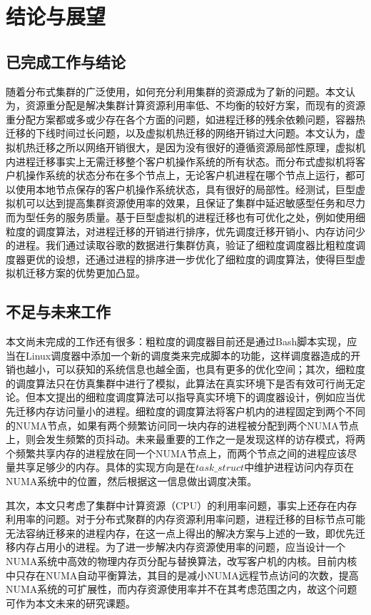 
\chapter{结论与展望}

\section{已完成工作与结论}
随着分布式集群的广泛使用，如何充分利用集群的资源成为了新的问题。本文认为，资源重分配是解决集群计算资源利用率低、不均衡的较好方案，而现有的资源重分配方案都或多或少存在各个方面的问题，如进程迁移的残余依赖问题，容器热迁移的下线时间过长问题，以及虚拟机热迁移的网络开销过大问题。本文认为，虚拟机热迁移之所以网络开销很大，是因为没有很好的遵循资源局部性原理，虚拟机内进程迁移事实上无需迁移整个客户机操作系统的所有状态。而分布式虚拟机将客户机操作系统的状态分布在多个节点上，无论客户机进程在哪个节点上运行，都可以使用本地节点保存的客户机操作系统状态，具有很好的局部性。经测试，巨型虚拟机可以达到提高集群资源使用率的效果，且保证了集群中延迟敏感型任务和尽力而为型任务的服务质量。基于巨型虚拟机的进程迁移也有可优化之处，例如使用细粒度的调度算法，对进程迁移的开销进行排序，优先调度迁移开销小、内存访问少的进程。我们通过读取谷歌的数据进行集群仿真，验证了细粒度调度器比粗粒度调度器更优的设想，还通过进程的排序进一步优化了细粒度的调度算法，使得巨型虚拟机迁移方案的优势更加凸显。

\section{不足与未来工作}
本文尚未完成的工作还有很多：粗粒度的调度器目前还是通过Bash脚本实现，应当在Linux调度器中添加一个新的调度类来完成脚本的功能，这样调度器造成的开销也越小，可以获知的系统信息也越全面，也具有更多的优化空间；其次，细粒度的调度算法只在仿真集群中进行了模拟，此算法在真实环境下是否有效可行尚无定论。但本文提出的细粒度调度算法可以指导真实环境下的调度器设计，例如应当优先迁移内存访问量小的进程。细粒度的调度算法将客户机内的进程固定到两个不同的NUMA节点，如果有两个频繁访问同一块内存的进程被分配到两个NUMA节点上，则会发生频繁的页抖动。未来最重要的工作之一是发现这样的访存模式，将两个频繁共享内存的进程放在同一个NUMA节点上，而两个节点之间的进程应该尽量共享足够少的内存。具体的实现方向是在$task\_struct$中维护进程访问内存页在NUMA系统中的位置，然后根据这一信息做出调度决策。

其次，本文只考虑了集群中计算资源（CPU）的利用率问题，事实上还存在内存利用率的问题。对于分布式聚群的内存资源利用率问题，进程迁移的目标节点可能无法容纳迁移来的进程内存，在这一点上得出的解决方案与上述的一致，即优先迁移内存占用小的进程。为了进一步解决内存资源使用率的问题，应当设计一个NUMA系统中高效的物理内存页分配与替换算法，改写客户机的内核。目前内核中只存在NUMA自动平衡算法\cite{balancing}，其目的是减小NUMA远程节点访问的次数，提高NUMA系统的可扩展性，而内存资源使用率并不在其考虑范围之内，故这个问题可作为本文未来的研究课题。
